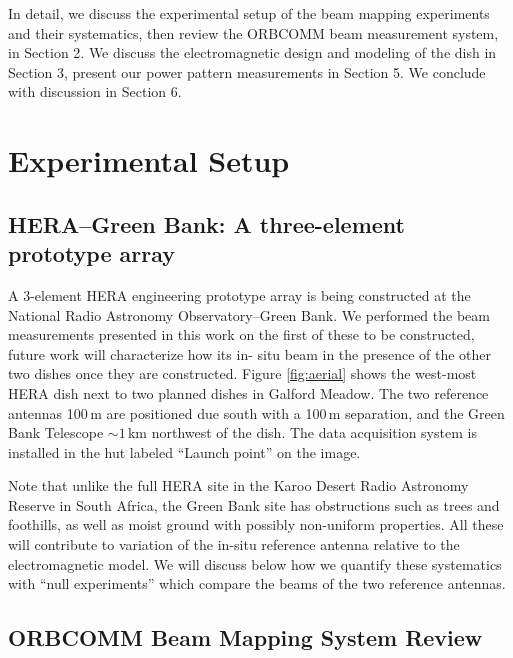 \documentclass{emulateapj}
\begin{document}
In detail, we discuss the experimental setup of the beam mapping experiments and their systematics, then 
review  the ORBCOMM beam measurement system, in Section 2. We discuss the electromagnetic design and 
modeling of the dish in Section 3, present our power pattern measurements in Section 5. We conclude with 
discussion in Section 6.

\section{Experimental Setup}

\subsection{HERA--Green Bank: A three-element prototype array}

A 3-element HERA engineering prototype array is being constructed at the National Radio 
Astronomy Observatory--Green Bank. We performed the beam measurements presented in 
this work on the first of these to be constructed, future work will characterize how its in-
situ beam in the presence of the other two dishes once they are constructed. Figure 
\ref{fig:aerial} shows the west-most HERA dish next to two planned dishes in Galford 
Meadow. The two reference antennas 100\,m are positioned due south with a 100\,m 
separation, and the Green Bank Telescope $\sim1$\,km northwest of the dish. The data 
acquisition system is installed in the hut labeled ``Launch point'' on the image. 

Note that unlike the full HERA site in the Karoo Desert Radio Astronomy Reserve in 
South Africa, the Green Bank site has obstructions such as trees and foothills, as well as 
moist ground with possibly non-uniform properties. All these will contribute to variation 
of the in-situ reference antenna relative to the electromagnetic model. We will discuss 
below how we quantify these systematics with ``null experiments'' which compare the 
beams of the two reference antennas.


\subsection{ORBCOMM Beam Mapping System Review}
\end{document}
